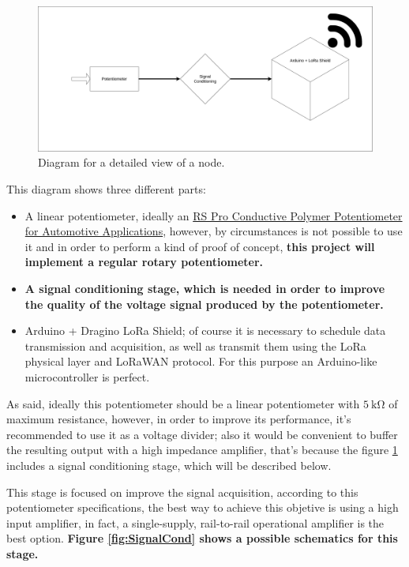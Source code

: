 \documentclass[11pt,a4paper,dvipsnames,twoside]{article}
\newcounter{subsubsubsection}[subsubsection]
\newcommand{\doubt}[1] {\textbf{\color{Red3}#1}}
\begin{document}
\begin{figure}[htp]
  \centering
  \includegraphics[width=.9\textwidth]{../schemes/node_tbg.png}
  \caption{Diagram for a detailed view of a node.}
  \label{fig:NodeDiag}
\end{figure}

This diagram shows three different parts:

\begin{itemize}
  \item A linear potentiometer, ideally an \href{https://docs.rs-online.com/37bf/0900766b814f0bd0.pdf}{RS Pro Conductive Polymer
  Potentiometer for Automotive Applications}, however, by circumstances is not possible to use it and in order to perform a kind of proof of concept, \doubt{this project will implement a regular rotary potentiometer.}
  \item \doubt{A signal conditioning stage, which is needed in order to improve the quality of the voltage signal produced by the potentiometer.}
  \item Arduino + Dragino LoRa Shield; of course it is necessary to schedule data transmission and acquisition, as well as transmit them using the LoRa physical layer and LoRaWAN protocol. For this purpose an Arduino-like microcontroller is perfect.
\end{itemize}

As said, ideally this potentiometer should be a linear potentiometer with $5\ \si{\kilo\ohm}$ of maximum resistance, however, in order to improve its performance, it's recommended to use it as a voltage divider; also it would be convenient to buffer the resulting output with a high impedance amplifier, that's because the figure \ref{fig:NodeDiag} includes a signal conditioning stage, which will be described below.

This stage is focused on improve the signal acquisition, according to this potentiometer specifications, the best way to achieve this objetive is using a high input amplifier, in fact, a single-supply, rail-to-rail operational amplifier is the best option. \doubt{Figure \ref{fig:SignalCond} shows a possible schematics for this stage.}
\end{document}
